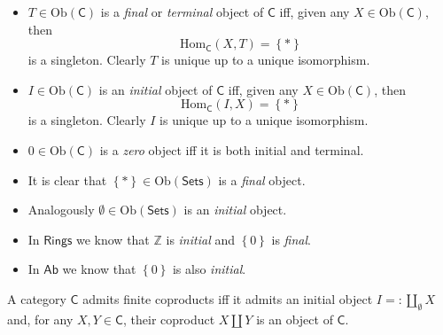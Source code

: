 \documentclass[../Main]{subfiles}
\begin{document}
\begin{defn}\leavevmode\vspace{-1\baselineskip}
	\begin{itemize}
		\item $T \in \mathrm{Ob} \left(\mathsf{C}\right)$ is a {\em final} or {\em terminal}
	object of $\mathsf{C}$ iff, given any $X \in \mathrm{Ob} \left(\mathsf{C}\right)$, then
	\begin{equation}
	\mathrm{Hom}_{\mathsf{C}} \left( X, T \right) = \left\{ * \right\}
	\end{equation} 
	is a singleton.
	Clearly $T$ is unique up to a unique isomorphism.

\item $I \in \mathrm{Ob} \left(\mathsf{C}\right)$ is an {\em initial} object of $\mathsf{C}$ iff,
	given any $X \in \mathrm{Ob} \left(\mathsf{C}\right)$, then
	\begin{equation}
	\mathrm{Hom}_{\mathsf{C}} \left( I, X \right) = \left\{ * \right\}
	\end{equation} 
	is a singleton.
	Clearly $I$ is unique up to a unique isomorphism.

\item $0 \in \mathrm{Ob} \left(\mathsf{C}\right)$ is a {\em zero} object iff it is both initial and terminal.
	\end{itemize}
\end{defn}

\begin{ex}\leavevmode\vspace{-.2\baselineskip}
	\begin{itemize}
		\item It is clear that $\left\{ * \right\} \in \mathrm{Ob} (\mathsf{Sets})$
			is a {\em final} object.
		\item Analogously $\emptyset \in \mathrm{Ob} \left(\mathsf{Sets}\right)$
			is an {\em initial} object.
		\item In $\mathsf{Rings}$ we know that $\mathbb{Z}$ is 
		{\em initial} and $\left\{ 0 \right\}$ is {\em final}.
	\item In $\mathsf{Ab}$ we know that $\left\{ 0 \right\}$ is also {\em initial}.
	\end{itemize}
\end{ex} 

\begin{rem}
	A category $\mathsf{C}$ admits finite coproducts iff
	it admits an initial object $I =:\coprod_{\emptyset} X$
	and, for any $X, Y \in \mathsf{C}$, 
	their coproduct $X \coprod Y$ is an object of $\mathsf{C}$.
\end{rem}
\end{document}
